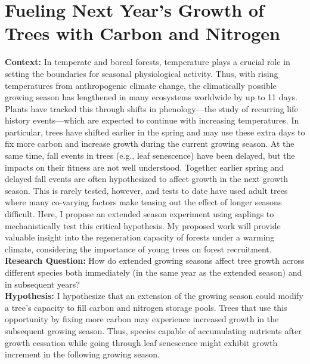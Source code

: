 \documentclass{article}
\begin{document}
\section*{Fueling Next Year's Growth of Trees with Carbon and Nitrogen}
\textbf {Context:} %
In temperate and boreal forests, temperature plays a crucial role in setting the boundaries for seasonal physiological activity. Thus, with rising temperatures from anthropogenic climate change, the climatically possible growing season has lengthened in many ecosystems worldwide by up to 11 days.\citep{korner_phenology_2010, menzel_growing_1999} Plants have tracked this through shifts in phenology—the study of recurring life history events—which are expected to continue with increasing temperatures.\citep{wolkovich_warming_2012} In particular, trees have shifted earlier in the spring and may use these extra days to fix more carbon and increase growth during the current growing season.\citep{keenan_net_2014, wang_interactive_2020} At the same time, fall events in trees (e.g., leaf senescence) have been delayed, but the impacts on their fitness are not well understood. Together earlier spring and delayed fall events are often hypothesized to affect growth in the next growth season. This is rarely tested, however, and tests to date have used adult trees where many co-varying factors make teasing out the effect of longer seasons difficult. Here, I propose an extended season experiment using saplings to mechanistically test this critical hypothesis. My proposed work will provide valuable insight into the regeneration capacity of forests under a warming climate, considering the importance of young trees on forest recruitment.\citep{zohner_how_2021} \\
\textbf {Research Question:} How do extended growing seasons affect tree growth across different species both immediately (in the same year as the extended season) and in subsequent years? \\
\textbf {Hypothesis:} I hypothesize that an extension of the growing season could modify a tree’s capacity to fill carbon and nitrogen storage pools.\citep{chapin_ecology_1990, lawrence_variable_2018} Trees that use this opportunity by fixing more carbon may experience increased growth in the subsequent growing season.\citep{landhausser_partitioning_2012, martens_first-year_2007} Thus, species capable of accumulating nutrients after growth cessation while going through leaf senescence might exhibit growth increment in the following growing season.\citep{schott_premature_2013} \\
\end{document}
